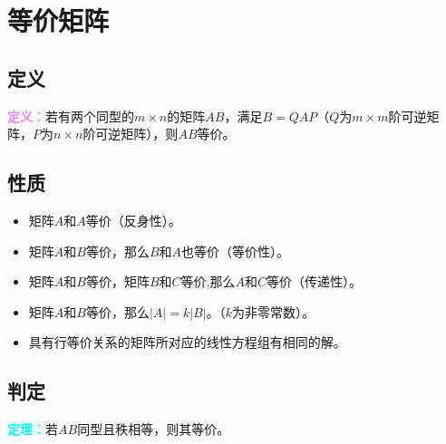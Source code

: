 \documentclass[UTF8, 12pt]{ctexart}
\begin{document}
\section{等价矩阵}

\subsection{定义}

\textcolor{violet}{\textbf{定义：}}若有两个同型的$m\times n$的矩阵$AB$，满足$B=QAP$（$Q$为$m\times m$阶可逆矩阵，$P$为$n\times n$阶可逆矩阵），则$AB$等价。

\subsection{性质}

\begin{itemize}
    \item 矩阵$A$和$A$等价（反身性）。
    \item 矩阵$A$和$B$等价，那么$B$和$A$也等价（等价性）。
    \item 矩阵$A$和$B$等价，矩阵$B$和$C$等价,那么$A$和$C$等价（传递性）。
    \item 矩阵$A$和$B$等价，那么$\vert A\vert=k\vert B\vert$。（$k$为非零常数）。
    \item 具有行等价关系的矩阵所对应的线性方程组有相同的解。
\end{itemize}

\subsection{判定}

\textcolor{aqua}{\textbf{定理：}}若$AB$同型且秩相等，则其等价。
\end{document}
